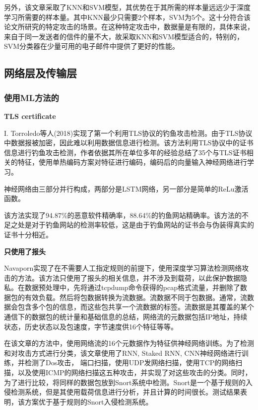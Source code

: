 \documentclass[12pt]{article} %
\begin{document}
另外，该文章采取了KNN和SVM模型，其优势在于其所需的样本量远远少于深度学习所需要的样本量。其中KNN最少只需要2个样本，SVM为5个。这十分符合该论文所研究的特定攻击的场景。在这种特定攻击中，数据量是有限的，具体来说，来自于同一发送者的信件的量不大，故采取KNN和SVM模型适合的，特别的，SVM分类器在少量可用的电子邮件中提供了更好的性能。

\subsection{网络层及传输层}
\label{ip}

\subsubsection{使用ML方法的}
\label{ml}

\textbf{TLS certificate}

I. Torroledo等人(2018)实现了第一个利用TLS协议的钓鱼攻击检测。由于TLS协议中数据报被加密，因此难以利用数据信息进行检测。该方法利用TLS协议中的证书信息进行钓鱼攻击检测，作者依据其所在单位多年的经验总结了35个与TLS证书相关的特征，使用单热编码方案对特征进行编码，编码后的向量输入神经网络进行学习。

神经网络由三部分并行构成，两部分是LSTM网络，另一部分是简单的ReLu激活函数。

该方法实现了94.87\%的恶意软件精确率，88.64\%的钓鱼网站精确率。该方法的不足之处是对于钓鱼网站的检测率较低，这是由于钓鱼网站的证书会与伪装得真实的证书十分相近。

\textbf{只使用了报头}

Navaporn实现了在不需要人工指定规则的前提下，使用深度学习算法检测网络攻击的方法。该方法只使用了报头的相关信息，并不涉及到载荷，以此保护数据隐私。在数据预处理中，先将通过tcpdump命令获得的pcap格式流量，并删除了数据包的有效负载。然后将包数据转换为流数据。流数据不同于包数据。通常，流数据会包含多个包的信息，而这些包共享一个流数据的标签。流数据是其覆盖的某个通信下的数据包的统计量和基础信息的总结，网络流的元数据包括IP地址，持续状态，历史状态以及包速度，字节速度供16个特征等等。

在该文章的方法中，使用网络流的16个元数据作为特征供神经网络训练。为了检测和对攻击方式进行分类，该文章使用了RNN, Staked RNN, CNN神经网络进行训练，并检测了Dos攻击， 端口扫描，使用UDP发网络扫描，使用TCP的网络扫描，以及使用ICMP的网络扫描这五种攻击，并实现了对这些攻击的分类。同时，为了进行比较，将同样的数据包放到Snort系统中检测。Snort是一个基于规则的入侵检测系统，但是其使用载荷信息进行分析，并且计算的时间很长。测试结果表明，该方案优于基于规则的Snort入侵检测系统。
\end{document}

